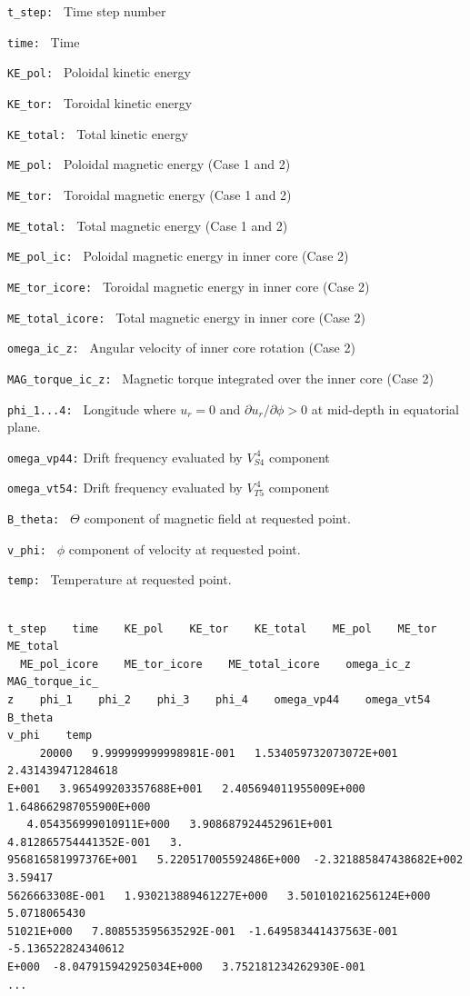 \begin{description}
\item{\tt t\_step:  }  Time step number
\item{\tt time:     }  Time
\item{\tt KE\_pol:   }  Poloidal kinetic energy
\item{\tt KE\_tor:   }  Toroidal kinetic energy
\item{\tt KE\_total: }  Total kinetic energy
\item{\tt ME\_pol:   }  Poloidal magnetic energy  (Case 1 and 2)
\item{\tt ME\_tor:   }  Toroidal magnetic energy  (Case 1 and 2)
\item{\tt ME\_total: }  Total magnetic energy  (Case 1 and 2)
\item{\tt ME\_pol\_ic:      }  Poloidal magnetic energy in inner core  (Case 2)
\item{\tt ME\_tor\_icore:   }  Toroidal magnetic energy in inner core (Case 2)
\item{\tt ME\_total\_icore: }  Total magnetic energy in inner core (Case 2)
\item{\tt omega\_ic\_z: } Angular velocity of inner core rotation (Case 2)
\item{\tt MAG\_torque\_ic\_z: }  Magnetic torque integrated over the inner core (Case 2)
\item{\tt phi\_1...4: } Longitude where $u_{r} = 0$ and $\partial u_{r} / \partial \phi > 0$ at mid-depth in equatorial plane.
\item{\tt omega\_vp44:} Drift frequency evaluated by $V_{S4}^{\ 4}$ component
\item{\tt omega\_vt54:} Drift frequency evaluated by $V_{T5}^{\ 4}$ component
\item{\tt B\_theta: } $\Theta$ component of magnetic field at requested point.
\item{\tt v\_phi: } $\phi$ component of velocity at requested point.
\item{\tt temp: } Temperature at requested point.


\end{description}

{\small 
\begin{verbatim}

t_step    time    KE_pol    KE_tor    KE_total    ME_pol    ME_tor    ME_total  
  ME_pol_icore    ME_tor_icore    ME_total_icore    omega_ic_z    MAG_torque_ic_
z    phi_1    phi_2    phi_3    phi_4    omega_vp44    omega_vt54    B_theta    
v_phi    temp
     20000   9.999999999998981E-001   1.534059732073072E+001   2.431439471284618
E+001   3.965499203357688E+001   2.405694011955009E+000   1.648662987055900E+000
   4.054356999010911E+000   3.908687924452961E+001   4.812865754441352E-001   3.
956816581997376E+001   5.220517005592486E+000  -2.321885847438682E+002   3.59417
5626663308E-001   1.930213889461227E+000   3.501010216256124E+000   5.0718065430
51021E+000   7.808553595635292E-001  -1.649583441437563E-001  -5.136522824340612
E+000  -8.047915942925034E+000   3.752181234262930E-001
...
\end{verbatim}
}
 
